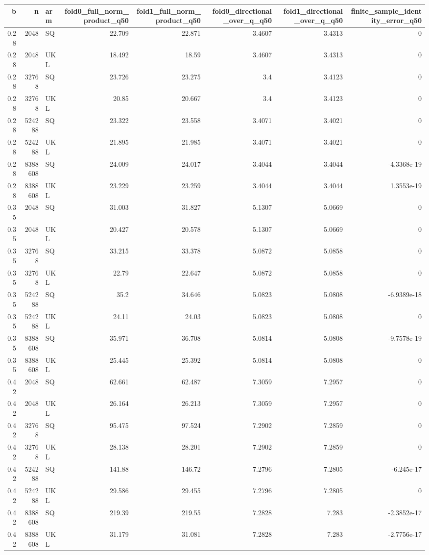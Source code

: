 \begin{tabular}{rrlrrrrr}
\toprule
b & n & arm & fold0_full_norm_product_q50 & fold1_full_norm_product_q50 & fold0_directional_over_q_q50 & fold1_directional_over_q_q50 & finite_sample_identity_error_q50 \\
\midrule
0.28 & 2048 & SQ & 22.709 & 22.871 & 3.4607 & 3.4313 & 0 \\
0.28 & 2048 & UKL & 18.492 & 18.59 & 3.4607 & 3.4313 & 0 \\
0.28 & 32768 & SQ & 23.726 & 23.275 & 3.4 & 3.4123 & 0 \\
0.28 & 32768 & UKL & 20.85 & 20.667 & 3.4 & 3.4123 & 0 \\
0.28 & 524288 & SQ & 23.322 & 23.558 & 3.4071 & 3.4021 & 0 \\
0.28 & 524288 & UKL & 21.895 & 21.985 & 3.4071 & 3.4021 & 0 \\
0.28 & 8388608 & SQ & 24.009 & 24.017 & 3.4044 & 3.4044 & -4.3368e-19 \\
0.28 & 8388608 & UKL & 23.229 & 23.259 & 3.4044 & 3.4044 & 1.3553e-19 \\
0.35 & 2048 & SQ & 31.003 & 31.827 & 5.1307 & 5.0669 & 0 \\
0.35 & 2048 & UKL & 20.427 & 20.578 & 5.1307 & 5.0669 & 0 \\
0.35 & 32768 & SQ & 33.215 & 33.378 & 5.0872 & 5.0858 & 0 \\
0.35 & 32768 & UKL & 22.79 & 22.647 & 5.0872 & 5.0858 & 0 \\
0.35 & 524288 & SQ & 35.2 & 34.646 & 5.0823 & 5.0808 & -6.9389e-18 \\
0.35 & 524288 & UKL & 24.11 & 24.03 & 5.0823 & 5.0808 & 0 \\
0.35 & 8388608 & SQ & 35.971 & 36.708 & 5.0814 & 5.0808 & -9.7578e-19 \\
0.35 & 8388608 & UKL & 25.445 & 25.392 & 5.0814 & 5.0808 & 0 \\
0.42 & 2048 & SQ & 62.661 & 62.487 & 7.3059 & 7.2957 & 0 \\
0.42 & 2048 & UKL & 26.164 & 26.213 & 7.3059 & 7.2957 & 0 \\
0.42 & 32768 & SQ & 95.475 & 97.524 & 7.2902 & 7.2859 & 0 \\
0.42 & 32768 & UKL & 28.138 & 28.201 & 7.2902 & 7.2859 & 0 \\
0.42 & 524288 & SQ & 141.88 & 146.72 & 7.2796 & 7.2805 & -6.245e-17 \\
0.42 & 524288 & UKL & 29.586 & 29.455 & 7.2796 & 7.2805 & 0 \\
0.42 & 8388608 & SQ & 219.39 & 219.55 & 7.2828 & 7.283 & -2.3852e-17 \\
0.42 & 8388608 & UKL & 31.179 & 31.081 & 7.2828 & 7.283 & -2.7756e-17 \\
\bottomrule
\end{tabular}
